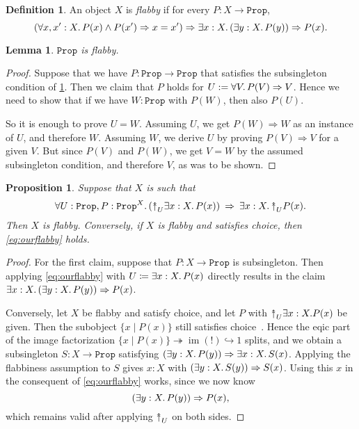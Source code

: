 \documentclass[11pt, oneside, article]{memoir}
\theoremstyle{plain}
\newtheorem{proposition}[theorem]{Proposition}
\newtheorem{lemma}[theorem]{Lemma}
\theoremstyle{definition}
\newtheorem{definition}[theorem]{Definition}
\theoremstyle{remark}
\DeclareMathOperator{\im}{im}
\newcommand{\const}[1]{\mathtt{#1}}
\newcommand{\Prop}{\const{Prop}}
\newcommand{\InSymbol}{{\upclose}}%
\newcommand{\In}[2][]{\InSymbol^{#1}_{#2}}
\newcommand{\upclose}{{\rotatebox[origin=c]{90}{$\twoheadrightarrow$}}}
\newcommand{\imp}{\Rightarrow}
\begin{document}
\begin{definition}\label{def:flabby}
An object $X$ is \emph{flabby} if for every $P : X \to \Prop$,
\[
	( \forall x,x' : X \ldotp P(x) \wedge P(x') \imp x = x') \imp \exists x : X \ldotp (\exists y : X \ldotp P(y)) \imp P(x) .
\]
\end{definition}

\begin{lemma}
$\Prop$ is flabby.
\end{lemma}

\begin{proof}
Suppose that we have $P : \Prop \to \Prop$ that satisfies the subsingleton condition of \cref{def:flabby}. Then we claim that $P$ holds for $U := \forall V \ldotp P(V) \imp V$. Hence we need to show that if we have $W : \Prop$ with $P(W)$, then also $P(U)$.

So it is enough to prove $U = W$. Assuming $U$, we get $P(W) \imp W$ as an instance of $U$, and therefore $W$. Assuming $W$, we derive $U$ by proving $P(V) \imp V$ for a given $V$. But since $P(V)$ and $P(W)$, we get $V = W$ by the assumed subsingleton condition, and therefore $V$, as was to be shown.
\end{proof}

\begin{proposition}\label{prop.flabbiness_equivalence}
Suppose that $X$ is such that
\begin{equation}\label{eq:ourflabby}
	\forall U : \Prop, P : \Prop^X . \left( \In{U} \exists x : X\ldotp P(x) \right) \: \imp \: \exists x : X \ldotp \In{U} P(x).
\end{equation}
Then $X$ is flabby. Conversely, if $X$ is flabby and satisfies choice, then \cref{eq:ourflabby} holds.
\end{proposition}


\begin{proof}
For the first claim, suppose that $P : X \to \Prop$ is subsingleton. Then applying \cref{eq:ourflabby} with $U \coloneqq \exists x : X \ldotp P(x)$ directly results in the claim $\exists x : X\ldotp (\exists y : X\ldotp P(y)) \imp P(x)$.

Conversely, let $X$ be flabby and satisfy choice, and let $P$ with $\In{U} \exists x : X. P(x)$ be given. Then the subobject $\{ x \mid P(x) \}$ still satisfies choice~\cite[Lemma D.4.5.9]{Johnstone:2002a}. Hence the eqic part of the image factorization $\{ x \mid P(x) \} \twoheadrightarrow \im(!) \hookrightarrow 1$ splits, and we obtain a subsingleton $S : X\to\Prop$ satisfying $(\exists y : X\ldotp P(y)) \imp \exists x : X\ldotp S(x)$. Applying the flabbiness assumption to $S$ gives $x : X$ with $(\exists y : X\ldotp S(y)) \imp S(x)$. Using this $x$ in the consequent of \cref{eq:ourflabby} works, since we now know
\[
	(\exists y : X\ldotp P(y)) \imp P(x),
\]
which remains valid after applying $\In{U}$ on both sides.
\end{proof}
\end{document}
